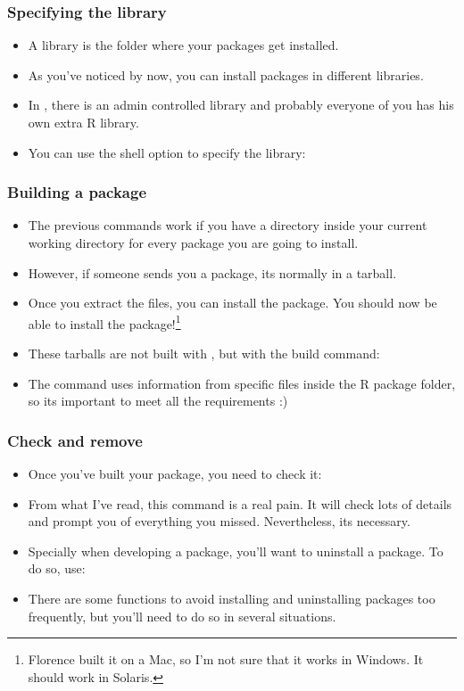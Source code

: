 \begin{frame}[allowframebreaks]
  \frametitle{Specifying the library}
  \begin{itemize}
  \item A library is the folder where your packages get installed.
  \item As you've noticed by now, you can install packages in different libraries.
  \item In , there is an admin controlled library and probably everyone of you has his own extra R library.
  \item You can use the shell option  to specify the library: \\ 
  \end{itemize}
\end{frame}

\begin{frame}[allowframebreaks]
  \frametitle{Building a package}
  \begin{itemize}
  \item The previous commands work if you have a directory inside your current working directory for every package you are going to install.
  \item However, if someone sends you a package, its normally in a tarball.
  \item Once you extract the files, you can install the package. You should now be able to install the  package!\footnote{Florence built it on a Mac, so I'm not sure that it works in Windows. It should work in Solaris.}
  \item These tarballs are not built with , but with the \alert{build} command: \\ 
  \item The  command uses information from specific files inside the R package folder, so its important to meet all the requirements :)
  \end{itemize}
\end{frame}

\begin{frame}[allowframebreaks]
  \frametitle{Check and remove}
  \begin{itemize}
  \item Once you've built your package, you need to \alert{check} it: \\ 
  \item From what I've read, this command is a real pain. It will check lots of details and prompt you of everything you missed. Nevertheless, its necessary.
  \item Specially when developing a package, you'll want to \alert{uninstall} a package. To do so, use: \\ 
  \item There are some functions to avoid installing and uninstalling packages too frequently, but you'll need to do so in several situations.
  \end{itemize}
\end{frame}

